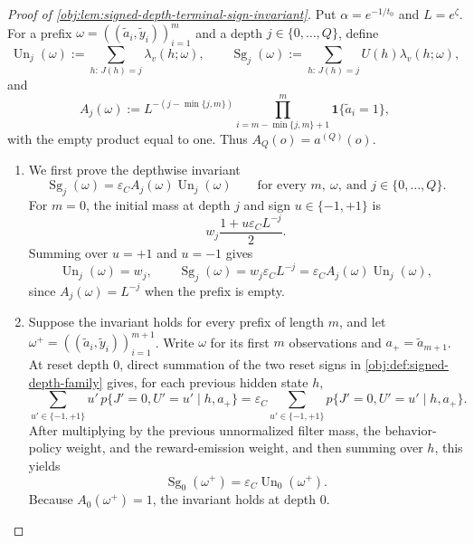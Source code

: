 \begin{proof}[Proof of \cref{obj:lem:signed-depth-terminal-sign-invariant}]
Put \(\alpha=e^{-1/t_0}\) and \(L=e^\zeta\).  For a prefix
\(\omega=((\tilde a_i,\tilde y_i))_{i=1}^m\) and a depth
\(j\in\{0,\ldots,Q\}\), define
\[
\operatorname{Un}_j(\omega)
:=
\sum_{h:\,J(h)=j}\lambda_v(h;\omega),
\qquad
\operatorname{Sg}_j(\omega)
:=
\sum_{h:\,J(h)=j}U(h)\lambda_v(h;\omega),
\]
and
\[
A_j(\omega)
:=
L^{-(j-\min\{j,m\})}
\prod_{i=m-\min\{j,m\}+1}^{m}\mathbf 1\{\tilde a_i=1\},
\]
with the empty product equal to one.  Thus \(A_Q(o)=a^{(Q)}(o)\).

\begin{enumerate}
\item We first prove the depthwise invariant
\[
\operatorname{Sg}_j(\omega)
=
\varepsilon_C A_j(\omega)\operatorname{Un}_j(\omega)
\qquad
\text{for every }m,\ \omega,\ \text{and }j\in\{0,\ldots,Q\}.
\]
For \(m=0\), the initial mass at depth \(j\) and sign \(u\in\{-1,+1\}\) is
\[
w_j\frac{1+u\varepsilon_C L^{-j}}{2}.
\]
Summing over \(u=+1\) and \(u=-1\) gives
\[
\operatorname{Un}_j(\omega)=w_j,
\qquad
\operatorname{Sg}_j(\omega)
=
w_j\varepsilon_C L^{-j}
=
\varepsilon_C A_j(\omega)\operatorname{Un}_j(\omega),
\]
since \(A_j(\omega)=L^{-j}\) when the prefix is empty.

\item Suppose the invariant holds for every prefix of length \(m\), and let
\(\omega^+=((\tilde a_i,\tilde y_i))_{i=1}^{m+1}\).  Write \(\omega\) for its first \(m\) observations and \(a_+=\tilde a_{m+1}\).  At reset depth \(0\), direct summation of the two reset signs in \cref{obj:def:signed-depth-family} gives, for each previous hidden state \(h\),
\[
\sum_{u'\in\{-1,+1\}}
u'\,p\{J'=0,U'=u'\mid h,a_+\}
=
\varepsilon_C
\sum_{u'\in\{-1,+1\}}
p\{J'=0,U'=u'\mid h,a_+\}.
\]
After multiplying by the previous unnormalized filter mass, the behavior-policy weight, and the reward-emission weight, and then summing over \(h\), this yields
\[
\operatorname{Sg}_0(\omega^+)
=
\varepsilon_C\operatorname{Un}_0(\omega^+).
\]
Because \(A_0(\omega^+)=1\), the invariant holds at depth \(0\).


\end{enumerate}
\end{proof}
